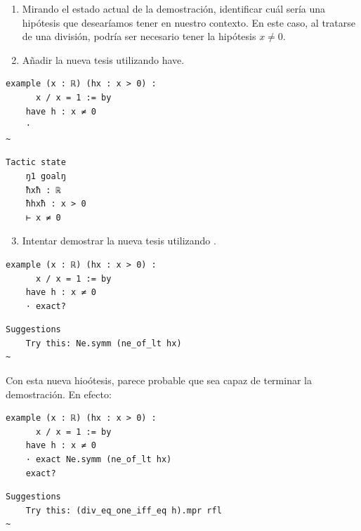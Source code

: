 \begin{enumerate}
  \item Mirando el estado actual de la demostración, identificar cuál sería una hipótesis que desearíamos tener en nuestro contexto. En este caso, al tratarse de una división, podría ser necesario tener la hipótesis $x \neq 0$.
  \item Añadir la nueva tesis utilizando have.
\end{enumerate}

\vspace{-1.5em}
\begin{minipage}[t]{0.58\textwidth}
\begin{lstlisting}[language=lean]
  example (x : ℝ) (hx : x > 0) :
      x / x = 1 := by
    have h : x ≠ 0
    · 
~
\end{lstlisting}
\end{minipage}%
\hfill
\begin{minipage}[t]{0.40\textwidth}
\begin{lstlisting}[language=infoview]
  Tactic state
    ŋ1 goalŋ
    ħxħ : ℝ
    ħhxħ : x > 0
    ⊢ x ≠ 0
\end{lstlisting}
\end{minipage}
\vspace{-1.5em}

\begin{enumerate}
  \setcounter{enumi}{2}
  \item Intentar demostrar la nueva tesis utilizando .
\end{enumerate}

\vspace{-1.5em}
\begin{minipage}[t]{0.58\textwidth}
\begin{lstlisting}[language=lean]
  example (x : ℝ) (hx : x > 0) :
      x / x = 1 := by
    have h : x ≠ 0
    · exact?
\end{lstlisting}
\end{minipage}%
\hfill
\begin{minipage}[t]{0.40\textwidth}
\begin{lstlisting}[language=infoview]
  Suggestions
    Try this: Ne.symm (ne_of_lt hx)
~
\end{lstlisting}
\end{minipage}


Con esta nueva hioótesis, parece probable que  sea capaz de terminar la demostración. En efecto:

\begin{minipage}[t]{0.58\textwidth}
\begin{lstlisting}[language=lean]
  example (x : ℝ) (hx : x > 0) :
      x / x = 1 := by
    have h : x ≠ 0
    · exact Ne.symm (ne_of_lt hx)
    exact?
\end{lstlisting}
\end{minipage}%
\hfill
\begin{minipage}[t]{0.40\textwidth}
\begin{lstlisting}[language=infoview]
  Suggestions
    Try this: (div_eq_one_iff_eq h).mpr rfl
~
\end{lstlisting}
\end{minipage}

